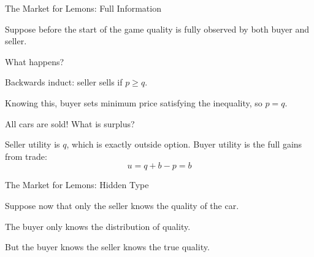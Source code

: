 \documentclass[aspectratio=169]{beamer}
\newenvironment{wideitemize}{\itemize\addtolength{\itemsep}{10pt}}{\enditemize}
\begin{document}
\begin{frame}{The Market for Lemons: Full Information}
\begin{wideitemize}
    \item  Suppose before the start of the game quality is fully observed by both buyer and seller.
    \item What happens?\pause
    \item Backwards induct: seller sells if $p\geq q$.\pause
    \item Knowing this, buyer sets minimum price satisfying the inequality, so $p=q$.
    \item All cars are sold! What is surplus?\pause
    \item Seller utility is $q$, which is exactly outside option. Buyer utility is the full gains from trade:
    \[u=q+b-p=b\]
\end{wideitemize}

\end{frame}

\begin{frame}{The Market for Lemons: Hidden Type}
\begin{wideitemize}
    \item Suppose now that only the seller knows the quality of the car.
    \item The buyer only knows the distribution of quality.
    \item But the buyer knows the seller knows the true quality.
\end{wideitemize}
    
\end{frame}
\end{document}
